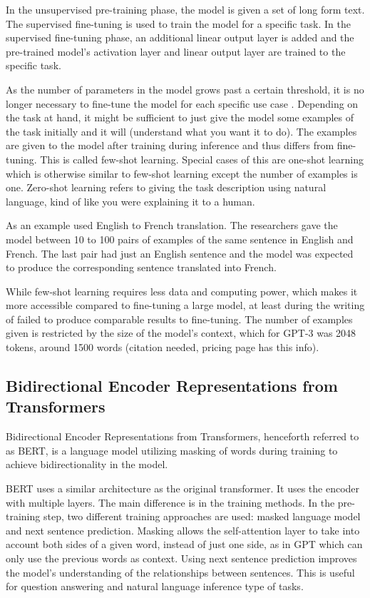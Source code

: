 \documentclass[twoside]{article}
\begin{document}
In the unsupervised pre-training phase, the model is given a set of long form text. 
The supervised fine-tuning is used to train the
model for a specific task. In the supervised fine-tuning phase, an additional linear
output layer is added
and the pre-trained model's activation layer and linear output layer are trained
to the specific task. \cite{radford_improving_nodate}

As the number of parameters in the model grows past a certain threshold, it
is no longer necessary to fine-tune the model for each specific use case 
\cite{brown_language_2020}. Depending on the task at hand, it might be sufficient
to just give the model some examples of the task initially and it will (understand what you want it to do). The examples are given to
the model after training during inference and thus differs from fine-tuning. 
This is called few-shot learning. Special cases of this are one-shot learning which is
otherwise similar to few-shot learning except the number of examples is one.
Zero-shot learning refers to giving the task description using natural language,
kind of like you were explaining it to a human. 

As an example \cite{brown_language_2020} used English to French translation.
The researchers gave the model between 10 to 100 pairs of examples of the
same sentence in English and French. The last pair had just an English sentence
and the model was expected to produce the corresponding sentence translated into
French.

While few-shot learning requires less data and computing power, which makes it more
accessible compared to fine-tuning a large model, at least during the writing of 
\cite{brown_language_2020} failed to produce comparable results to fine-tuning.
The number of examples given is restricted by the size of the model's context,
which for GPT-3 was 2048 tokens, around 1500 words (citation needed, pricing page has this info).

\subsection{Bidirectional Encoder Representations from Transformers}
Bidirectional Encoder Representations from Transformers, henceforth referred to as BERT,
is a language model utilizing masking of words during training to achieve bidirectionality
in the model. \cite{devlin_bert_2019}

BERT uses a similar architecture as the original transformer. It uses the encoder with
multiple layers. The main difference is in the training methods. In the pre-training step,
two different training approaches are used: masked language model and next sentence prediction.
Masking allows the self-attention layer to take into account both sides of a given word, instead
of just one side, as in GPT which can only use the previous words as context. Using next sentence
prediction improves the model's understanding of the relationships between sentences. This is
useful for question answering and natural language inference type of tasks. \cite{devlin_bert_2019}
\end{document}
